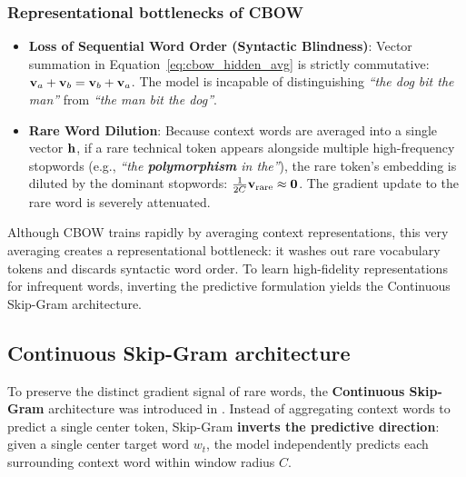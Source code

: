 \documentclass[../../main.tex]{subfiles}
\begin{document}
\subsubsection{Representational bottlenecks of CBOW}
\begin{itemize}
    \item \textbf{Loss of Sequential Word Order (Syntactic Blindness)}: Vector summation in Equation~\eqref{eq:cbow_hidden_avg} is strictly commutative: $\mathbf{v}_a + \mathbf{v}_b = \mathbf{v}_b + \mathbf{v}_a$. The model is incapable of distinguishing \emph{``the dog bit the man''} from \emph{``the man bit the dog''}.
    \item \textbf{Rare Word Dilution}: Because context words are averaged into a single vector $\mathbf{h}$, if a rare technical token appears alongside multiple high-frequency stopwords (e.g., \emph{``the \textbf{polymorphism} in the''}), the rare token's embedding is diluted by the dominant stopwords: $\frac{1}{2C} \mathbf{v}_{\text{rare}} \approx \mathbf{0}$. The gradient update to the rare word is severely attenuated.
\end{itemize}

Although CBOW trains rapidly by averaging context representations, this very averaging creates a representational bottleneck: it washes out rare vocabulary tokens and discards syntactic word order. To learn high-fidelity representations for infrequent words, inverting the predictive formulation yields the Continuous Skip-Gram architecture.

\clearpage


\subsection{Continuous Skip-Gram architecture}
\label{sec:skipgram_architecture}

To preserve the distinct gradient signal of rare words, the \textbf{Continuous Skip-Gram} architecture was introduced in \cite{mikolov2013efficient}. Instead of aggregating context words to predict a single center token, Skip-Gram \textbf{inverts the predictive direction}: given a single center target word $w_t$, the model independently predicts each surrounding context word within window radius $C$.
\end{document}
